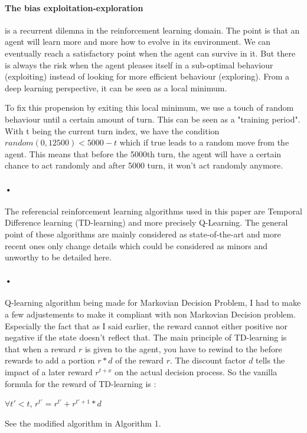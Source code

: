 \documentclass{article}
\begin{document}
\paragraph{The bias exploitation-exploration}
is a recurrent dilemna in the reinforcement learning domain. The point is that an agent will learn more and more how to evolve in its environment. We can eventually reach a satisfactory point when the agent can survive in it. But there is always the risk when the agent pleases itself in a sub-optimal behaviour (exploiting) instead of looking for more efficient behaviour (exploring). From a deep learning perspective, it can be seen as a local minimum.\par
To fix this propension by exiting this local minimum, we use a touch of random behaviour until a certain amount of turn. This can be seen as a "training period". With t being the current turn index, we have the condition $random(0, 12500) < 5000 - t$ which if true leads to a random move from the agent. This means that before the 5000th turn, the agent will have a certain chance to act randomly and after 5000 turn, it won't act randomly anymore.

\paragraph{•}
The referencial reinforcement learning algorithms used in this paper are Temporal Difference learning (TD-learning)\cite{tsitsiklis1997analysis} and more precisely Q-Learning\cite{watkins1992q}. The general point of these algorithms are mainly considered as state-of-the-art and more recent ones\cite{mnih2016asynchronous, van2016deep, hessel2018rainbow} only change details which could be considered as minors and unworthy to be detailed here.

\paragraph{•}
Q-learning algorithm being made for Markovian Decision Problem, I had to make a few adjustements to make it compliant with non Markovian Decision problem. Especially the fact that as I said earlier, the reward cannot either positive nor negative if the state doesn't reflect that. The main principle of TD-learning is that when a reward $r$ is given to the agent, you have to rewind to the before rewards to add a portion $r * d$ of the reward $r$. The discount factor $d$ tells the impact of a later reward $r^{t + x}$ on the actual decision process. So the vanilla formula for the reward of TD-learning is :\par
$\forall t' < t$, $r^{t'} = r^{t'} + r^{t' + 1} * d$\par
See the modified algorithm in Algorithm 1.
\end{document}
